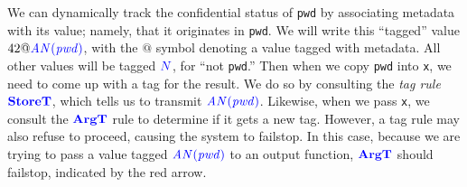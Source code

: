 \documentclass{llncs}
\begin{document}

We can dynamically track the confidential status of {\tt pwd} by associating metadata with its
value; namely, that it originates in {\tt pwd}. We will write this ``tagged'' value \(42 @ \mathit{\color{blue} \mathit{AN(pwd)}}\),
with the \(@\) symbol denoting a value tagged with metadata.
All other values will be tagged \({\color{blue} N}\), for ``not {\tt pwd}.''
Then when we copy {\tt pwd} into {\tt x}, we need to come up with a tag for the result.
We do so by consulting the {\em tag rule} \(\color{blue} \mathbf{StoreT}\), which tells us to transmit \(\mathit{\color{blue} \mathit{AN(pwd)}}\).
Likewise, when we pass {\tt x}, we consult the \(\color{blue} \mathbf{ArgT}\) rule to determine if it
gets a new tag. However, a tag rule may also refuse to proceed, causing the system
to failstop. In this case, because we are trying to pass a value tagged \(\mathit{\color{blue} \mathit{AN(pwd)}}\) to
an output function, \(\color{blue} \mathbf{ArgT}\) should failstop, indicated by the red arrow.
\end{document}
